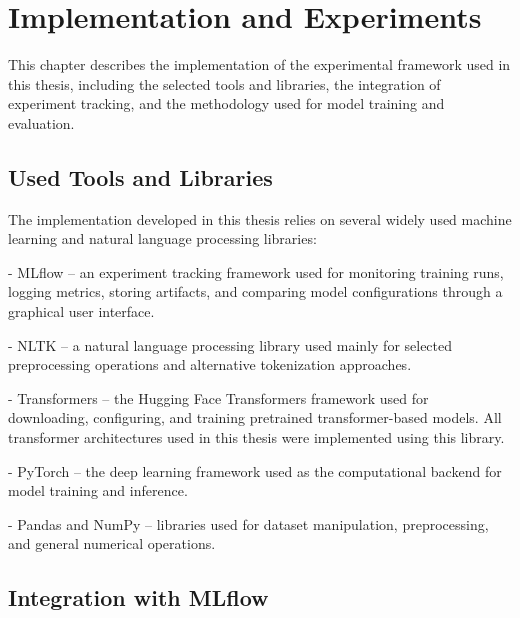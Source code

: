 \chapter{Implementation and Experiments}

\begin{markdown}

This chapter describes the implementation of the experimental framework used in this thesis, including the selected tools and libraries, the integration of experiment tracking, and the methodology used for model training and evaluation.

\end{markdown}

\section{Used Tools and Libraries}

\begin{markdown}

The implementation developed in this thesis relies on several widely used machine learning and natural language processing libraries:

- MLflow -- an experiment tracking framework used for monitoring training runs, logging metrics, storing artifacts, and comparing model configurations through a graphical user interface.

- NLTK -- a natural language processing library used mainly for selected preprocessing operations and alternative tokenization approaches.

- Transformers -- the Hugging Face Transformers framework used for downloading, configuring, and training pretrained transformer-based models. All transformer architectures used in this thesis were implemented using this library.

- PyTorch -- the deep learning framework used as the computational backend for model training and inference.

- Pandas and NumPy -- libraries used for dataset manipulation, preprocessing, and general numerical operations.

\end{markdown}


\section{Integration with MLflow}

